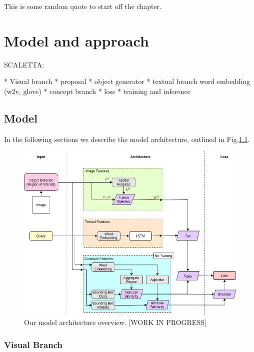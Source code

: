 \begin{savequote}[75mm]
This is some random quote to start off the chapter.
\end{savequote}

\chapter{Model and approach}


SCALETTA:

* Visual branch
  * proposal 
  * object generator
* textual branch
  word embedding (w2v, glove)
* concept branch
* loss
* training and inference

\section{Model}

In the following sections we describe the model architecture, outlined
in Fig.\ref{fig:model-architecture}.

\begin{figure}
  \centering
  \includegraphics[width=1.0\textwidth]{figures/model-architecture.png}
  \caption[TODO]{Our model architecture overview. [WORK IN PROGRESS]}
  \label{fig:model-architecture}
\end{figure}

\subsection{Visual Branch}
\label{subsec:visual-branch}


